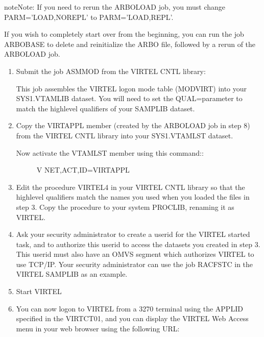 \documentclass[letterpaper,10pt,english]{sphinxmanual}
\begin{document}
\begin{sphinxadmonition}{note}{Note:}
If you need to rerun the ARBOLOAD job, you must change PARM=’LOAD,NOREPL’ to PARM=’LOAD,REPL’.

If you wish to completely start over from the beginning, you can run the job ARBOBASE to delete and reinitialize the ARBO file, followed by a rerun of the ARBOLOAD job.
\end{sphinxadmonition}
\begin{enumerate}
%
\setcounter{enumi}{7}
\item {} 
Submit the job ASMMOD from the VIRTEL CNTL library:

This job assembles the VIRTEL logon mode table (MODVIRT) into your SYS1.VTAMLIB dataset.  You will need to set the QUAL=parameter to match the high\sphinxhyphen{}level qualifiers of your SAMPLIB dataset.

\item {} 
Copy the VIRTAPPL member (created by the ARBOLOAD job in step 8) from the VIRTEL CNTL library into your SYS1.VTAMLST dataset.
\begin{description}
\item[{Now activate the VTAMLST member using this command::}] \leavevmode
V NET,ACT,ID=VIRTAPPL

\end{description}

\item {} 
Edit the procedure VIRTEL4 in your VIRTEL CNTL library so that the high\sphinxhyphen{}level qualifiers match the names you used when you loaded the files in step 3.  Copy the procedure to your system PROCLIB, renaming it as VIRTEL.

\item {} 
Ask your security administrator to create a userid for the VIRTEL started task, and to authorize this userid to access the datasets you created in step 3. This userid must also have an OMVS segment which authorizes VIRTEL to use TCP/IP. Your security administrator can use the job RACFSTC in the VIRTEL SAMPLIB as an example.

\item {} 
Start VIRTEL

\item {} 
You can now logon to VIRTEL from a 3270 terminal using the APPLID specified in the VIRTCT01, and you can display the VIRTEL Web Access menu in your web browser using the following URL:



\end{enumerate}
\end{document}
